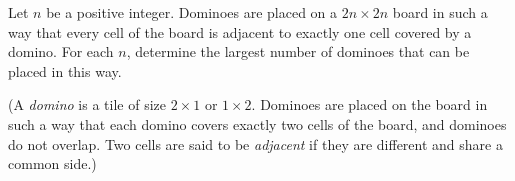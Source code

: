Let $n$ be a positive integer. Dominoes are placed on a $2n\times2n$ board in such a way that every cell of the board is adjacent to exactly one cell covered by a domino. For each $n$, determine the largest number of dominoes that can be placed in this way.

(A \emph{domino} is a tile of size $2\times1$ or $1\times2$. Dominoes are placed on the board in such a way that each domino covers exactly two cells of the board, and dominoes do not overlap. Two cells are said to be \emph{adjacent} if they are different and share a common side.)
